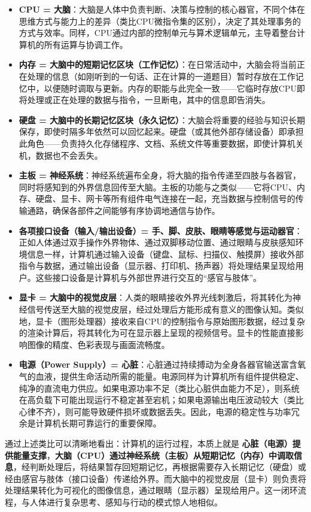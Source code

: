 \documentclass[12pt,UTF8]{ctexbook}
\begin{document}
\begin{itemize}
\item \textbf{CPU = 大脑}：大脑是人体中负责判断、决策与控制的核心器官，不同个体在思维方式与能力上的差异（类比CPU微指令集的区别），决定了其处理事务的方式与效率。同样，CPU通过内部的控制单元与算术逻辑单元，主导着整台计算机的所有运算与协调工作。
\item \textbf{内存 = 大脑中的短期记忆区块（工作记忆）}：在日常活动中，大脑会将当前正在处理的信息（如刚听到的一句话、正在计算的一道题目）暂时存放在工作记忆中，以便随时调取与更新。内存的职能与此完全一致——它临时存放CPU即将处理或正在处理的数据与指令，一旦断电，其中的信息即告消失。
\item \textbf{硬盘 = 大脑中的长期记忆区块（永久记忆）}：大脑会将重要的经验与知识长期保存，即使时隔多年依然可以回忆起来。硬盘（或其他外部存储设备）即承担此角色——负责持久化存储程序、文档、系统文件等重要数据，即使计算机关机，数据也不会丢失。
\item \textbf{主板 = 神经系统}：神经系统遍布全身，将大脑的指令传递至四肢与各器官，同时将感知到的外界信息回传至大脑。主板的功能与之类似——它将CPU、内存、硬盘、显卡、网卡等所有组件电气连接在一起，充当数据与控制信号的传输通路，确保各部件之间能够有序协调地通信与协作。
\item \textbf{各项接口设备（输入/输出设备）= 手、脚、皮肤、眼睛等感觉与运动器官}：正如人体通过双手操作外界物体、通过双脚移动位置、通过眼睛与皮肤感知环境信息一样，计算机通过输入设备（键盘、鼠标、扫描仪、触摸屏）接收外部指令与数据，通过输出设备（显示器、打印机、扬声器）将处理结果呈现给用户。这些接口设备是计算机与外部世界进行交互的“感官与肢体”。

\item \textbf{显卡 = 大脑中的视觉皮层}：人类的眼睛接收外界光线刺激后，将其转化为神经信号传送至大脑的视觉皮层，经过处理后方能形成有意义的图像认知。类似地，显卡（图形处理器）接收来自CPU的控制指令与原始图形数据，经过复杂的渲染计算后，将其转化为可在显示器上呈现的视频信号。显卡的性能直接影响图像的精度、色彩表现与画面流畅度。

\item \textbf{电源（Power Supply）= 心脏}：心脏通过持续搏动为全身各器官输送富含氧气的血液，提供生命活动所需的能量。电源同样为计算机所有组件提供稳定、纯净的直流电力供应。如果电源功率不足（类比心脏供血能力不足），则系统在高负载下可能出现运行不稳定甚至宕机；如果电源输出电压波动较大（类比心律不齐），则可能导致硬件损坏或数据丢失。因此，电源的稳定性与功率冗余是计算机长期可靠运行的重要保障。
\end{itemize}

通过上述类比可以清晰地看出：计算机的运行过程，本质上就是 \textbf{心脏（电源）提供能量支撑}，\textbf{大脑（CPU）通过神经系统（主板）从短期记忆（内存）中调取信息}，经判断处理后，将结果暂存回短期记忆，再根据需要存入长期记忆（硬盘）或经由感官与肢体（接口设备）传递给外界。而大脑中的视觉皮层（显卡）则负责将处理结果转化为可视化的图像信息，通过眼睛（显示器）呈现给用户。这一闭环流程，与人体进行复杂思考、感知与行动的模式惊人地相似。
\end{document}
